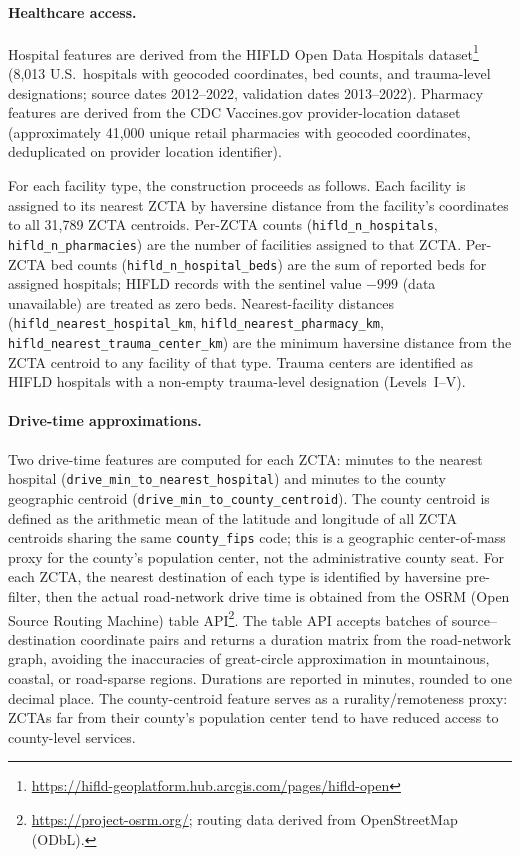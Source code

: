 \documentclass{article}
\begin{document}
\paragraph{Healthcare access.} Hospital features are derived from the HIFLD Open Data Hospitals dataset\footnote{\url{https://hifld-geoplatform.hub.arcgis.com/pages/hifld-open}} (8,013 U.S.\ hospitals with geocoded coordinates, bed counts, and trauma-level designations; source dates 2012--2022, validation dates 2013--2022). Pharmacy features are derived from the CDC Vaccines.gov provider-location dataset (approximately 41,000 unique retail pharmacies with geocoded coordinates, deduplicated on provider location identifier).

For each facility type, the construction proceeds as follows. Each facility is assigned to its nearest ZCTA by haversine distance from the facility's coordinates to all 31,789 ZCTA centroids. Per-ZCTA counts (\texttt{hifld\_n\_hospitals}, \texttt{hifld\_n\_pharmacies}) are the number of facilities assigned to that ZCTA. Per-ZCTA bed counts (\texttt{hifld\_n\_hospital\_beds}) are the sum of reported beds for assigned hospitals; HIFLD records with the sentinel value $-999$ (data unavailable) are treated as zero beds. Nearest-facility distances (\texttt{hifld\_nearest\_hospital\_km}, \texttt{hifld\_nearest\_pharmacy\_km}, \texttt{hifld\_nearest\_trauma\_center\_km}) are the minimum haversine distance from the ZCTA centroid to any facility of that type. Trauma centers are identified as HIFLD hospitals with a non-empty trauma-level designation (Levels~I--V).

\paragraph{Drive-time approximations.} Two drive-time features are computed for each ZCTA: minutes to the nearest hospital (\texttt{drive\_min\_to\_nearest\_hospital}) and minutes to the county geographic centroid (\texttt{drive\_min\_to\_county\_centroid}). The county centroid is defined as the arithmetic mean of the latitude and longitude of all ZCTA centroids sharing the same \texttt{county\_fips} code; this is a geographic center-of-mass proxy for the county's population center, not the administrative county seat. For each ZCTA, the nearest destination of each type is identified by haversine pre-filter, then the actual road-network drive time is obtained from the OSRM (Open Source Routing Machine) table API\footnote{\url{https://project-osrm.org/}; routing data derived from OpenStreetMap (ODbL).}. The table API accepts batches of source--destination coordinate pairs and returns a duration matrix from the road-network graph, avoiding the inaccuracies of great-circle approximation in mountainous, coastal, or road-sparse regions. Durations are reported in minutes, rounded to one decimal place. The county-centroid feature serves as a rurality/remoteness proxy: ZCTAs far from their county's population center tend to have reduced access to county-level services.
\end{document}
